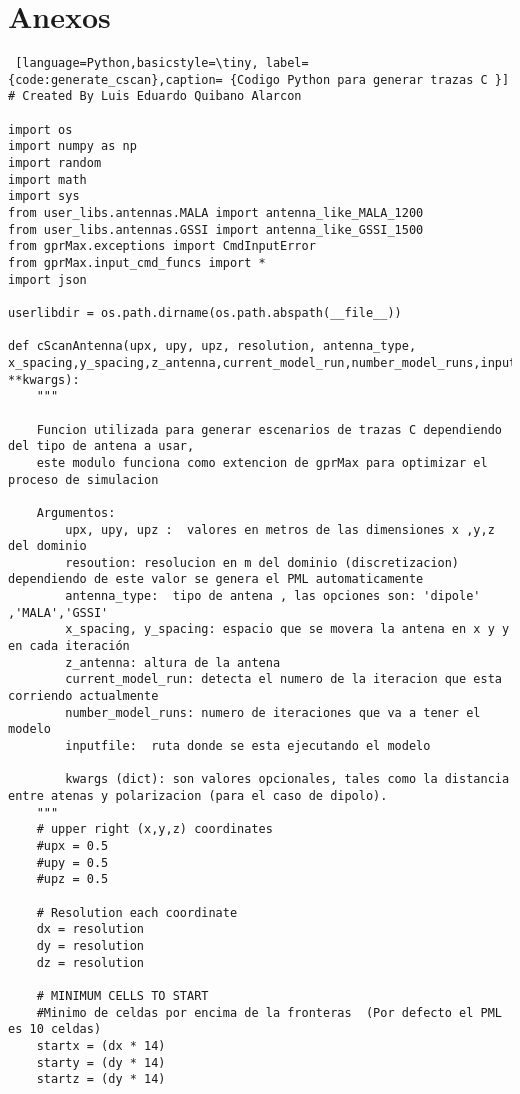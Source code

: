 \section{Anexos}

\begin{lstlisting} [language=Python,basicstyle=\tiny, label={code:generate_cscan},caption= {Codigo Python para generar trazas C }]
# Created By Luis Eduardo Quibano Alarcon

import os
import numpy as np
import random
import math
import sys
from user_libs.antennas.MALA import antenna_like_MALA_1200
from user_libs.antennas.GSSI import antenna_like_GSSI_1500
from gprMax.exceptions import CmdInputError
from gprMax.input_cmd_funcs import *
import json

userlibdir = os.path.dirname(os.path.abspath(__file__))

def cScanAntenna(upx, upy, upz, resolution, antenna_type, x_spacing,y_spacing,z_antenna,current_model_run,number_model_runs,inputfile, **kwargs):
    """

    Funcion utilizada para generar escenarios de trazas C dependiendo del tipo de antena a usar,
    este modulo funciona como extencion de gprMax para optimizar el proceso de simulacion

    Argumentos:
        upx, upy, upz :  valores en metros de las dimensiones x ,y,z del dominio
        resoution: resolucion en m del dominio (discretizacion) dependiendo de este valor se genera el PML automaticamente
        antenna_type:  tipo de antena , las opciones son: 'dipole' ,'MALA','GSSI'
        x_spacing, y_spacing: espacio que se movera la antena en x y y en cada iteración
        z_antenna: altura de la antena
        current_model_run: detecta el numero de la iteracion que esta corriendo actualmente
        number_model_runs: numero de iteraciones que va a tener el modelo
        inputfile:  ruta donde se esta ejecutando el modelo

        kwargs (dict): son valores opcionales, tales como la distancia entre atenas y polarizacion (para el caso de dipolo).
    """
    # upper right (x,y,z) coordinates
    #upx = 0.5
    #upy = 0.5
    #upz = 0.5

    # Resolution each coordinate
    dx = resolution
    dy = resolution
    dz = resolution

    # MINIMUM CELLS TO START
    #Minimo de celdas por encima de la fronteras  (Por defecto el PML es 10 celdas)
    startx = (dx * 14)
    starty = (dy * 14)
    startz = (dy * 14)


\end{lstlisting}
